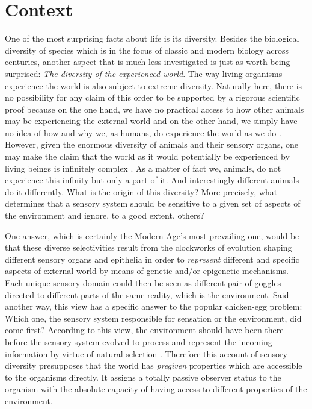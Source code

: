 
\section{Context}

One of the most surprising facts about life is its diversity. Besides the
biological diversity of species which is in the focus of classic and modern
biology across centuries, another aspect that is much less investigated is
just as worth being surprised: \textit{The diversity of the experienced world}.
The way living organisms experience the world is also subject to
extreme diversity. Naturally here, there is no possibility for any claim of this
order to be supported by a rigorous scientific proof because on the one
hand, we have no practical access to how other animals may be experiencing
the external world and on the other hand, we simply have no idea of how and
why we, as humans, do experience the world as we do \citep{oregan2001a}.
However, given the enormous diversity of animals and their sensory organs,
one may make the claim that the world as it would potentially be
experienced by living beings is infinitely complex \citep{freeman2000a}.
As a matter of fact we, animals, do not experience this infinity but only a
part of it. And interestingly different animals do it differently. What is
the origin of this diversity?  More precisely, what determines that a
sensory system should be sensitive to a given set of aspects of the
environment and ignore, to a good extent, others? 



One answer, which is certainly the Modern Age's most prevailing one, would
be that these diverse selectivities result from the clockworks of evolution
shaping different sensory organs and epithelia in order to
\textit{represent} different and specific aspects of external world by
means of genetic and/or epigenetic mechanisms. Each unique sensory domain
could then be seen as different pair of goggles directed to different parts
of the same reality, which is the environment. Said another way, this view
has a specific answer to the popular chicken-egg problem: Which one, the
sensory system responsible for sensation or the environment, did come
first?  According to this view, the environment should have been there
before the sensory system evolved to process and represent the incoming
information by virtue of natural selection \citep{varela1992a}.  Therefore
this account of sensory diversity presupposes that the world has
\textit{pregiven} properties which are accessible to the organisms
directly. It assigns a totally passive observer status to the organism with
the absolute capacity of having access to different properties of the
environment. 


